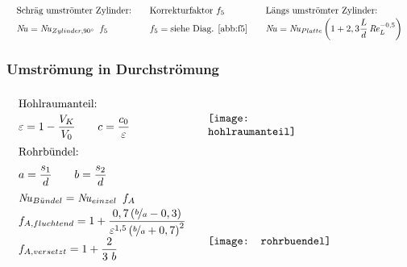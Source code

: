 	\skipabove{-10pt}
	\[ \arraycolsep=1em  \def\arraystretch{1.5}
	\begin{array}{lll}
		\text{Schräg umströmter Zylinder:}
			& \text{Korrekturfaktor } f_5
			& \text{Längs umströmter Zylinder:} \\
		 \Nuss = \Nuss_{Zylinder,\ang{90}} \ f_5
			&  f_5 = \text{siehe Diag. \ref{abb:f5}}
			&  \Nuss =  \Nuss_{Platte}  \left(1+ 2,3 \dfrac{L}{d} \Reyn_L^{-0,5}\right)
	\end{array}\]

\subsubsection{Umströmung in Durchströmung} \label{sec:um-in-durch}
		\skipabove{-20pt}
		\[ \arraycolsep=1em  \def\arraystretch{1.7}
		\begin{array}{ll}
			\text{Hohlraumanteil:}                                                                                                  & \multirow{3}{0.24\textwidth}{\texttt{[image: hohlraumanteil]}} \\
			\varepsilon = 1- \dfrac{V_K}{V_0}  \qquad  c = \dfrac{c_0}{\varepsilon}                                                 &                                                                                  \\
			\text{Rohrbündel:}                                                                                                      & \multirow{9}{0.5\textwidth}{\texttt{[image: rohrbuendel]}}     \\
			a = \dfrac{s_1}{d}  \qquad  b = \dfrac{s_2}{d}                                                                          &                                                                                  \\
			\Nuss_{B\ue ndel} = \Nuss_{einzel}\ f_A                                                                                 &                                                                                  \\
			f_{A,fluchtend} = 1+ \dfrac{0,7 \left(\nicefrac{b}{a}-0,3\right)}{\varepsilon^{1,5} \left(\nicefrac{b}{a}+0,7\right)^2} &                                                                                  \\
			f_{A,versetzt} = 1 + \dfrac{2}{3\ b}                                                                                    &                                                                                  \\

\end{array}\]
